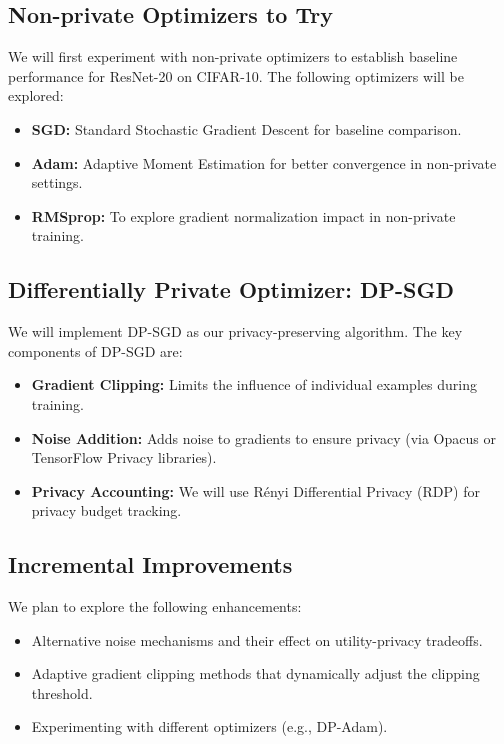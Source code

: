 \documentclass{article}
\begin{document}
\subsection{Non-private Optimizers to Try}
We will first experiment with non-private optimizers to establish baseline performance for ResNet-20 on CIFAR-10. The following optimizers will be explored:
\begin{itemize}
    \item \textbf{SGD:} Standard Stochastic Gradient Descent for baseline comparison.
    \item \textbf{Adam:} Adaptive Moment Estimation for better convergence in non-private settings.
    \item \textbf{RMSprop:} To explore gradient normalization impact in non-private training.
\end{itemize}

\subsection{Differentially Private Optimizer: DP-SGD}
We will implement DP-SGD as our privacy-preserving algorithm. The key components of DP-SGD are:
\begin{itemize}
    \item \textbf{Gradient Clipping:} Limits the influence of individual examples during training.
    \item \textbf{Noise Addition:} Adds noise to gradients to ensure privacy (via Opacus or TensorFlow Privacy libraries).
    \item \textbf{Privacy Accounting:} We will use Rényi Differential Privacy (RDP) for privacy budget tracking.
\end{itemize}

\subsection{Incremental Improvements}
We plan to explore the following enhancements:
\begin{itemize}
    \item Alternative noise mechanisms and their effect on utility-privacy tradeoffs.
    \item Adaptive gradient clipping methods that dynamically adjust the clipping threshold.
    \item Experimenting with different optimizers (e.g., DP-Adam).
\end{itemize}
\end{document}
